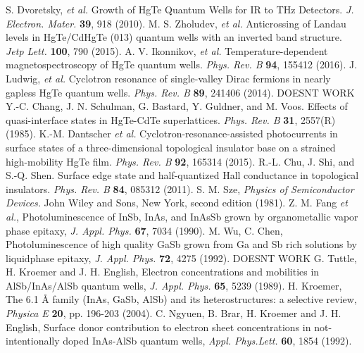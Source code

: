 \documentclass[titlepage,a4paper]{book}
\begin{document}
\begin{thebibliography}{199}
S. Dvoretsky, \textit{et al.} Growth of HgTe Quantum Wells for IR to THz Detectors. \textit{J. Electron. Mater.} \textbf{39}, 918 (2010).
M. S. Zholudev, \textit{et al.} Anticrossing of Landau levels in HgTe/CdHgTe (013) quantum wells with an inverted band structure. \textit{Jetp Lett.} \textbf{100}, 790 (2015).
A. V. Ikonnikov, \textit{et al.} Temperature-dependent magnetospectroscopy of HgTe quantum wells. \textit{Phys. Rev. B} \textbf{94}, 155412 (2016).
J. Ludwig, \textit{et al.} Cyclotron resonance of single-valley Dirac fermions in nearly gapless HgTe quantum wells. \textit{Phys. Rev. B} \textbf{89}, 241406 (2014).
DOESNT WORK
Y.-C. Chang, J. N. Schulman, G. Bastard, Y. Guldner, and M. Voos. Effects of quasi-interface states in HgTe-CdTe superlattices. \textit{Phys. Rev. B} \textbf{31}, 2557(R) (1985).
K.-M. Dantscher \textit{et al.} Cyclotron-resonance-assisted photocurrents in surface states of a three-dimensional topological insulator base on a strained high-mobility HgTe film. \textit{Phys. Rev. B} \textbf{92}, 165314 (2015).
R.-L. Chu, J. Shi, and S.-Q. Shen. Surface edge state and half-quantized Hall conductance in topological insulators. \textit{Phys. Rev. B} \textbf{84}, 085312 (2011). 
S. M. Sze, \textit{Physics of Semiconductor Devices.} John Wiley and Sons, New York, second edition (1981).
Z. M. Fang \textit{et al.}, Photoluminescence of InSb, InAs, and InAsSb grown by organometallic vapor phase epitaxy, \textit{J. Appl. Phys.} \textbf{67}, 7034 (1990).
M. Wu, C. Chen, Photoluminescence of high quality GaSb grown from Ga and Sb rich solutions by liquidphase epitaxy, \textit{J. Appl. Phys.} \textbf{72}, 4275 (1992).
DOESNT WORK
G. Tuttle, H. Kroemer and J. H. English, Electron concentrations and mobilities in AlSb/InAs/AlSb quantum wells, \textit{J. Appl. Phys.} \textbf{65}, 5239 (1989).
H. Kroemer, The 6.1 Å family (InAs, GaSb, AlSb) and its heterostructures: a selective review, \textit{Physica E} \textbf{20}, pp. 196-203 (2004). 
C. Ngyuen, B. Brar, H. Kroemer and J. H. English, Surface donor contribution to electron sheet concentrations in not-intentionally doped InAs-AlSb quantum wells, \textit{Appl. Phys.Lett.} \textbf{60}, 1854 (1992).

\end{thebibliography}
\end{document}
